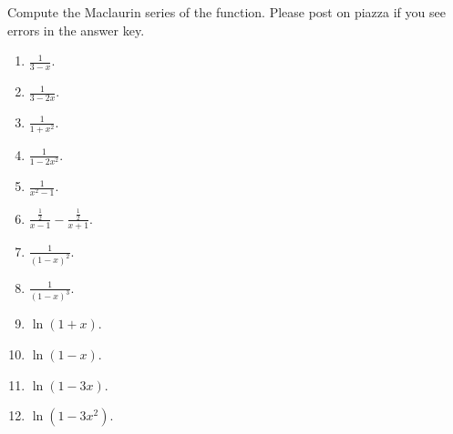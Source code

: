 Compute the Maclaurin series of the function. Please post on piazza if you see errors in the answer key.
\begin{multicols}{2}
\begin{enumerate}
\item $\displaystyle \frac{1}{3-x}$.

\item $\displaystyle \frac{1}{3-2x}$.


\item $\displaystyle \frac{1}{1+x^2}$.


\item $\displaystyle \frac{1}{1-2x^2}$.

\item $\displaystyle \frac{1}{x^2-1}$. \label{problemMaclaurin(1/(x^2-1))}

\item $\displaystyle\frac{\frac12}{x-1}-\frac{\frac12}{x+1}$.

\item $\displaystyle \frac{1}{(1-x)^2}$.

\item $\displaystyle \frac{1}{(1-x)^3}$.

\item $\displaystyle\ln (1+x)$.

\item $\ln (1-x)$.

\item $\ln (1-3x)$.

\item $\ln (1-3x^2)$.



\end{enumerate}
\end{multicols}
